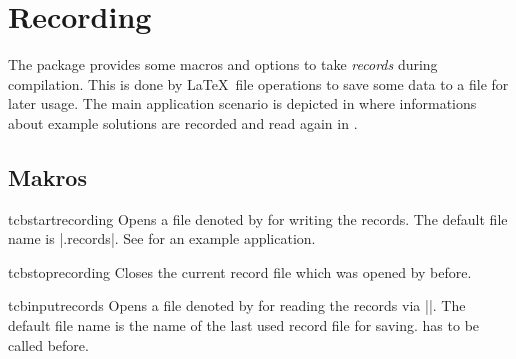 \clearpage
\section{Recording}\label{sec:recording}
The package provides some macros and options to take \emph{records} during
compilation. This is done by \LaTeX\ file operations to save some data
to a file for later usage. The main application scenario is depicted in
 where
informations about example solutions are recorded and read again
in .

\subsection{Makros}\label{sec:recording-makros}
\begin{docCommand}[doc new=2014-11-28]{tcbstartrecording}{}
  Opens a file denoted by  for writing the records.
  The default file name is |\jobname.records|.
  See  for an example application.
\end{docCommand}


\begin{docCommand}[doc new=2014-11-28]{tcbstoprecording}{}
  Closes the current record file which was opened by 
  before.
\end{docCommand}

\begin{docCommand}[doc new=2014-11-28]{tcbinputrecords}{}
  Opens a file denoted by  for reading the records via ||.
  The default file name is the name of the last used record file for saving.
   has to be called before.
\end{docCommand}


